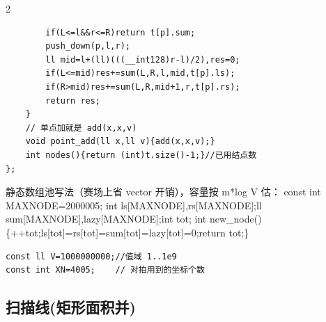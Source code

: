 \documentclass[UTF8,fontset=fandol,a4paper,twoside]{ctexart}
\newcommand{\note}[1]{{\fontsize{10}{12}\selectfont #1\par}}
\begin{document}
\begin{multicols}{2}
\begin{lstlisting}
        if(L<=l&&r<=R)return t[p].sum;
        push_down(p,l,r);
        ll mid=l+(ll)(((__int128)r-l)/2),res=0;
        if(L<=mid)res+=sum(L,R,l,mid,t[p].ls);
        if(R>mid)res+=sum(L,R,mid+1,r,t[p].rs);
        return res;
    }
    // 单点加就是 add(x,x,v)
    void point_add(ll x,ll v){add(x,x,v);}
    int nodes(){return (int)t.size()-1;}//已用结点数
};
\end{lstlisting}
\note{静态数组池写法（赛场上省 vector 开销），容量按 m*log V 估： const int MAXNODE=\allowbreak{}2000005; int ls[\allowbreak{}MAXNODE]\allowbreak{},\allowbreak{}rs[\allowbreak{}MAXNODE]\allowbreak{};ll sum[\allowbreak{}MAXNODE]\allowbreak{},\allowbreak{}lazy[\allowbreak{}MAXNODE]\allowbreak{};int tot; int new\_node(\allowbreak{})\allowbreak{}\{+\allowbreak{}+\allowbreak{}tot;ls[\allowbreak{}tot]\allowbreak{}=\allowbreak{}rs[\allowbreak{}tot]\allowbreak{}=\allowbreak{}sum[\allowbreak{}tot]\allowbreak{}=\allowbreak{}lazy[\allowbreak{}tot]\allowbreak{}=\allowbreak{}0;return tot;\}}
\begin{lstlisting}
const ll V=1000000000;//值域 1..1e9
const int XN=4005;    // 对拍用到的坐标个数
\end{lstlisting}
\subsection{扫描线(矩形面积并)}


\end{multicols}
\end{document}
